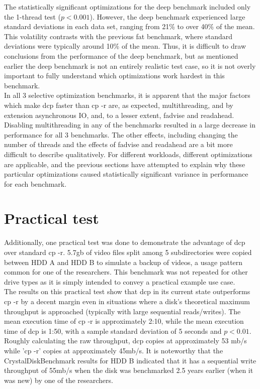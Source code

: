 \documentclass[12pt]{article}
\begin{document}
The statistically significant optimizations for the deep benchmark included
only the 1-thread test ($p < 0.001$). However, the deep benchmark experienced
large standard deviations in each data set, ranging from 21\% to over 40\%
of the mean. This volatility contrasts with the previous fat benchmark,
where standard deviations were typically around 10\% of the mean. Thus,
it is difficult to draw conclusions from the performance of the deep benchmark,
but as mentioned earlier the deep benchmark is not an entirely realistic test
case, so it is not overly important to fully understand which optimizations
work hardest in this benchmark. \\

In all 3 selective optimization benchmarks, it is apparent that the major
factors which make dcp faster than cp -r are, as expected, multithreading,
and by extension asynchronous IO, and, to a lesser extent, fadvise and readahead.
Disabling multithreading in any of the benchmarks resulted in a large decrease
in performance for all 3 benchmarks. The other effects, including changing
the number of threads and the effects of fadvise and readahead are a bit more
difficult to describe qualitatively. For different workloads, different optimizations
are applicable, and the previous sections have attempted to explain why these
particular optimizations caused statistically significant variance in performance
for each benchmark. \\


\section{Practical test}
Additionally, one practical test was done to demonstrate the advantage
of dcp over standard cp -r. 5.7gb of video files split among 5 subdirectories were copied between
HDD A and HDD B to simulate a backup of videos, a usage pattern common for one of the researchers.
This benchmark was not repeated for other drive types as it is simply intended to convey a practical example use
case. \\

The results on this practical test show that dcp in its current state outperforms cp -r by a decent margin even
in situations where a disk's theoretical maximum throughput is approached (typically with large sequential reads/writes).
The mean execution time of cp -r is approximately 2:10, while the mean execution time of dcp is 1:50, with a sample standard deviation of
5 seconds and $p < 0.01$. Roughly calculating the raw throughput, dcp copies at approximately 53 mb/s while 'cp -r' copies
at approximately 45mb/s. It is noteworthy that the CrystalDiskBenchmark results for HDD B indicated that it has a sequential
write throughput of 55mb/s when the disk was benchmarked 2.5 years earlier (when it was new) by one of the researchers. \\
\end{document}
